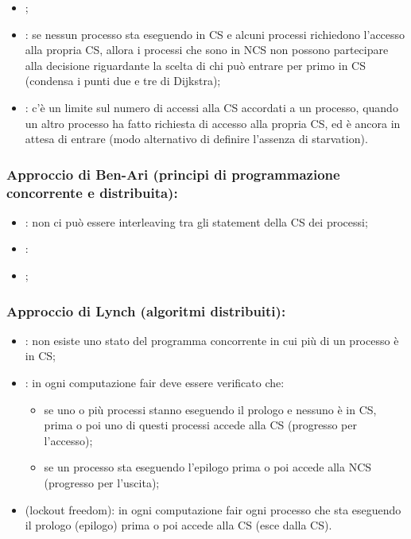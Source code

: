 \begin{itemize}
  \item {};
  \item {}: se nessun processo sta eseguendo in CS e alcuni processi richiedono l'accesso alla propria CS, allora i processi che sono in NCS non possono partecipare alla decisione riguardante la scelta di chi può entrare per primo in CS (condensa i punti due e tre di Dijkstra);
  \item {}: c'è un limite sul numero di accessi alla CS accordati a un processo, quando un altro processo ha fatto richiesta di accesso alla propria CS, ed è ancora in attesa di entrare (modo alternativo di definire l'assenza di starvation).
\end{itemize}

\subsubsection{Approccio di Ben-Ari (principi di programmazione concorrente e distribuita):}

\begin{itemize}
  \item {}: non ci può essere interleaving tra gli statement della CS dei processi;
  \item {}:
  \item {};
\end{itemize}

\subsubsection{Approccio di Lynch (algoritmi distribuiti):}

\begin{itemize}
  \item {}: non esiste uno stato del programma concorrente in cui più di un processo è in CS;
  \item {}: in ogni computazione fair deve essere verificato che:
    \begin{itemize}
      \item se uno o più processi stanno eseguendo il prologo e nessuno è in CS, prima o poi uno di questi processi accede alla CS (progresso per l'accesso);
      \item se un processo sta eseguendo l'epilogo prima o poi accede alla NCS (progresso per l'uscita);
    \end{itemize}
  \item {} (lockout freedom): in ogni computazione fair ogni processo che sta eseguendo il prologo (epilogo) prima o poi accede alla CS (esce dalla CS).
\end{itemize}

